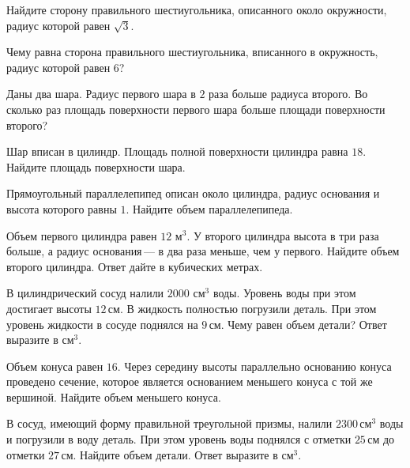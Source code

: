 \begin{consultation}
\begin{listofex}
		\item Найдите сторону правильного шестиугольника, описанного около окружности, радиус которой равен \(\sqrt{3}\).
		\item Чему равна сторона правильного шестиугольника, вписанного в окружность, радиус которой равен \(6\)?
		\item Даны два шара. Радиус первого шара в \(2\) раза больше радиуса второго. Во сколько раз площадь поверхности первого шара больше площади поверхности второго?
		\item Шар вписан в цилиндр. Площадь полной поверхности цилиндра равна \(18\). Найдите площадь поверхности шара.
		\item Прямоугольный параллелепипед описан около цилиндра, радиус основания и высота которого равны \(1\). Найдите объем параллелепипеда.
		\item Объем первого цилиндра равен \(12\) м\(^3\). У второго цилиндра высота в три раза больше, а радиус основания --- в два раза меньше, чем у первого. Найдите объем второго цилиндра. Ответ дайте в кубических метрах.
		\item В цилиндрический сосуд налили \(2000\) см\(^3\) воды. Уровень воды при этом достигает высоты \(12\) см. В жидкость полностью погрузили деталь. При этом уровень жидкости в сосуде поднялся на \(9\) см. Чему равен объем детали? Ответ выразите в см\(^3\).
		\item Объем конуса равен \(16\). Через середину высоты параллельно основанию конуса проведено сечение, которое является основанием меньшего конуса с той же вершиной. Найдите объем меньшего конуса.
		\item В сосуд, имеющий форму правильной треугольной призмы, налили \(2300\) см\(^3\) воды и погрузили в воду деталь. При этом уровень воды поднялся с отметки \(25\) см до отметки \(27\) см. Найдите объем детали. Ответ выразите в см\(^3\).
	\end{listofex}
\end{consultation}

